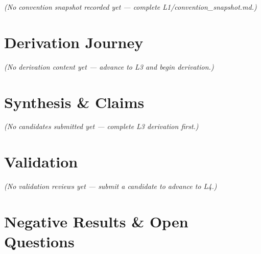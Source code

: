 \documentclass[11pt,a4paper]{article}
\numberwithin{equation}{section}
\begin{document}
\textit{(No convention snapshot recorded yet — complete L1/convention\_snapshot.md.)}


\section{Derivation Journey}

\textit{(No derivation content yet — advance to L3 and begin derivation.)}


\section{Synthesis \& Claims}

\textit{(No candidates submitted yet — complete L3 derivation first.)}


\section{Validation}

\textit{(No validation reviews yet — submit a candidate to advance to L4.)}


\section{Negative Results \& Open Questions}
\end{document}
